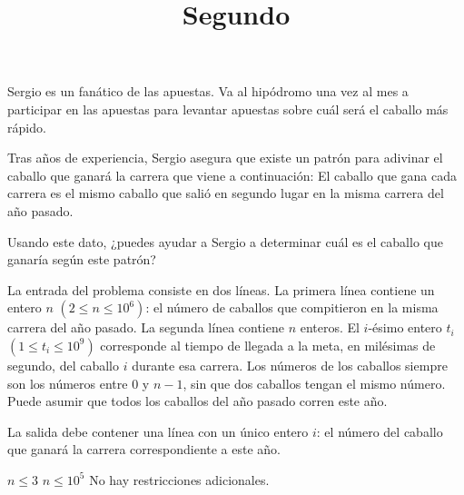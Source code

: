 \documentclass{oci}
\title{Segundo}
\begin{document}
\begin{problemDescription}
Sergio es un fanático de las apuestas.
Va al hipódromo una vez al mes a participar en las apuestas para levantar apuestas sobre cuál será el caballo más rápido.

Tras años de experiencia, Sergio asegura que existe un patrón para adivinar el caballo que ganará la carrera que viene a continuación:
El caballo que gana cada carrera es el mismo caballo que salió en segundo lugar en la misma carrera del año pasado.

Usando este dato, ¿puedes ayudar a Sergio a determinar cuál es el caballo que ganaría según este patrón?
\end{problemDescription}

\begin{inputDescription}
La entrada del problema consiste en dos líneas.
La primera línea contiene un entero $n$ $(2 \le n \le 10^6)$: el número de caballos que compitieron en la misma carrera del año pasado.
La segunda línea contiene $n$ enteros. El $i$-ésimo entero $t_i$ $(1 \le t_i \le 10^9)$ corresponde al tiempo de llegada a la meta, en milésimas de segundo, del caballo $i$ durante esa carrera. Los números de los caballos siempre son los números entre $0$ y $n-1$, sin que dos caballos tengan el mismo número.
Puede asumir que todos los caballos del año pasado corren este año.
\end{inputDescription}

\begin{outputDescription}
La salida debe contener una línea con un único entero $i$: el número del caballo que ganará la carrera correspondiente a este año.
\end{outputDescription}

\begin{scoreDescription}
  $n \le 3$
  $n \le 10^5$
  No hay restricciones adicionales.
\end{scoreDescription}

\begin{sampleDescription}
\end{sampleDescription}
\end{document}
